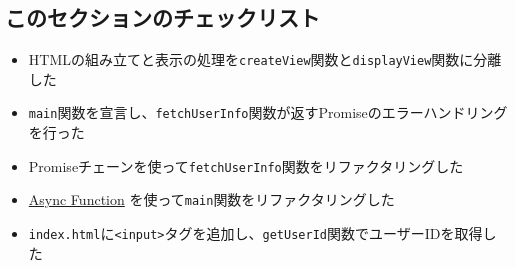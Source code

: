 \hypertarget{section-checklist}{%
\subsection{このセクションのチェックリスト}\label{section-checklist}}

\begin{itemize}
\item
  HTMLの組み立てと表示の処理を\texttt{createView}関数と\texttt{displayView}関数に分離した
\item
  \texttt{main}関数を宣言し、\texttt{fetchUserInfo}関数が返すPromiseのエラーハンドリングを行った
\item
  Promiseチェーンを使って\texttt{fetchUserInfo}関数をリファクタリングした
\item
  \hyperlink{async-function}{Async Function}
  を使って\texttt{main}関数をリファクタリングした
\item
  \texttt{index.html}に\texttt{<input>}タグを追加し、\texttt{getUserId}関数でユーザーIDを取得した
\end{itemize}
